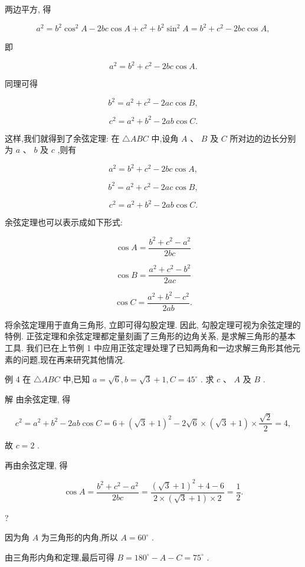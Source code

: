 \documentclass[10pt]{article}
\begin{document}
两边平方, 得

\[
{a}^{2} = {b}^{2}{\cos }^{2}A - {2bc}\cos A + {c}^{2} + {b}^{2}{\sin }^{2}A = {b}^{2} + {c}^{2} - {2bc}\cos A,
\]

即

\[
{a}^{2} = {b}^{2} + {c}^{2} - {2bc}\cos A.
\]

同理可得

\[
{b}^{2} = {a}^{2} + {c}^{2} - {2ac}\cos B,
\]

\[
{c}^{2} = {a}^{2} + {b}^{2} - {2ab}\cos C.
\]

这样,我们就得到了余弦定理: 在 \(\bigtriangleup {ABC}\) 中,设角 \(A\text{ 、 }B\) 及 \(C\) 所对边的边长分别为 \(a\text{ 、 }b\) 及 \(c\) ,则有

\[
{a}^{2} = {b}^{2} + {c}^{2} - {2bc}\cos A,
\]

\[
{b}^{2} = {a}^{2} + {c}^{2} - {2ac}\cos B,
\]

\[
{c}^{2} = {a}^{2} + {b}^{2} - {2ab}\cos C.
\]

余弦定理也可以表示成如下形式:

\[
\cos A = \frac{{b}^{2} + {c}^{2} - {a}^{2}}{2bc}
\]

\[
\cos B = \frac{{a}^{2} + {c}^{2} - {b}^{2}}{2ac}
\]

\[
\cos C = \frac{{a}^{2} + {b}^{2} - {c}^{2}}{2ab}.
\]

将余弦定理用于直角三角形, 立即可得勾股定理. 因此, 勾股定理可视为余弦定理的特例. 正弦定理和余弦定理都定量刻画了三角形的边角关系, 是求解三角形的基本工具. 我们已在上节例 1 中应用正弦定理处理了已知两角和一边求解三角形其他元素的问题,现在再来研究其他情况.

例 4 在 \(\bigtriangleup {ABC}\) 中,已知 \(a = \sqrt{6},b = \sqrt{3} + 1,C = {45}^{ \circ  }\) . 求 \(c\text{ 、 }A\) 及 \(B\) .

解 由余弦定理, 得

\[
{c}^{2} = {a}^{2} + {b}^{2} - {2ab}\cos C = 6 + {\left( \sqrt{3} + 1\right) }^{2} - 2\sqrt{6} \times  \left( {\sqrt{3} + 1}\right)  \times  \frac{\sqrt{2}}{2} = 4,
\]

故 \(c = 2\) .

再由余弦定理, 得

\[
\cos A = \frac{{b}^{2} + {c}^{2} - {a}^{2}}{2bc} = \frac{{\left( \sqrt{3} + 1\right) }^{2} + 4 - 6}{2 \times  \left( {\sqrt{3} + 1}\right)  \times  2} = \frac{1}{2}.
\]

?

因为角 \(A\) 为三角形的内角,所以 \(A = {60}^{ \circ  }\) .

由三角形内角和定理,最后可得 \(B = {180}^{ \circ  } - A - C = {75}^{ \circ  }\) .
\end{document}
